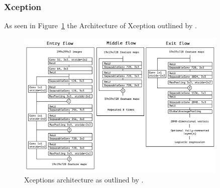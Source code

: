 \subsubsection{Xception}\label{xception}


As seen in Figure~\ref{fig:xceptionArchitecture} the Architecture of Xception outlined by \citep{chollet2017xception}.


\begin{figure}
    \centering
    \includegraphics[width=0.9\textwidth]{figures/xception_architecture.png}
    \caption{Xceptions architecture as outlined by \citeauthor{chollet2017xception}.}\label{fig:xceptionArchitecture}
\end{figure}